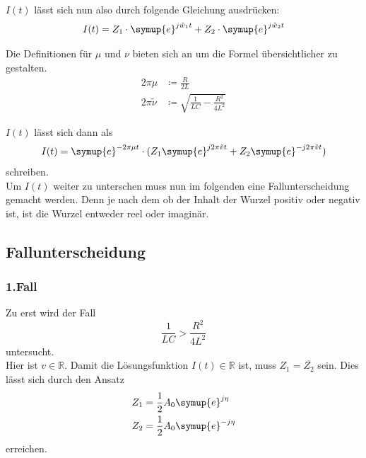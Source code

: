     \noindent $I(t)$ lässt sich nun also durch folgende Gleichung ausdrücken:
    \begin{equation}
        I(t) = Z_1 \cdot \symup{e}^{j \tilde{w}_1t} + Z_2 \cdot \symup{e}^{j\tilde{w}_2 t} \nonumber
    \end{equation}
    
    \noindent Die Definitionen für $\mu$ und $\nu$ bieten sich an um die Formel übersichtlicher zu gestalten.
    \begin{align}
        2 \pi \mu & \coloneq \frac{R}{2L} \nonumber\\ 
        2 \pi \tilde{\nu} & \coloneq \sqrt{\frac{1}{LC} - \frac{R^2}{4L^2}} \nonumber
    \end{align}

    \noindent $I(t)$ lässt sich dann als
    \begin{equation}
        I(t) = \symup{e}^{- 2 \pi \mu t} \cdot  (Z_1 \symup{e}^{j 2\pi \tilde{v}t} + Z_2 \symup{e}^{-j 2\pi \tilde{v} t}) \nonumber
    \end{equation}
    \noindent schreiben.\\
    Um $I(t)$ weiter zu unterschen muss  nun im folgenden eine Fallunterscheidung gemacht werden.
    Denn je nach dem ob der Inhalt der Wurzel positiv oder negativ ist, ist die Wurzel entweder reel oder imaginär. 
    \subsection{Fallunterscheidung}

        \subsubsection{1.Fall}
        Zu erst wird der Fall
        \begin{equation}
            \frac{1}{LC} > \frac{R^2}{4L^2}  \nonumber
        \end{equation}
        \noindent untersucht. \\
        Hier ist $v \in \mathds{R}$. Damit die Lösungsfunktion $I(t) \in \mathds{R}$ ist, muss
        $Z_1 = \overline{Z_2}$ sein. Dies lässt sich durch den Ansatz
        \begin{align}
            Z_1 & = \frac{1}{2} A_0 \symup{e}^{j \eta } \nonumber\\
            Z_2 & = \frac{1}{2} A_0 \symup{e}^{-j \eta} \nonumber
        \end{align}
        \noindent erreichen.
        

